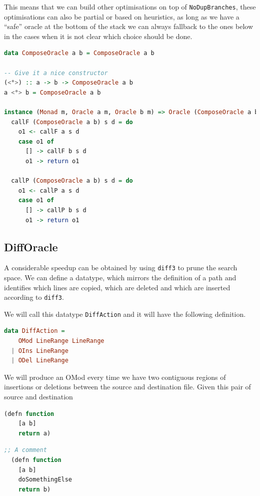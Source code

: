\documentclass[11pt]{article}
\begin{document}
This means that we can build other optimisations on top of 
\texttt{NoDupBranches}, these optimisations can also be partial or based on 
heuristics, as long as we have a ``safe'' oracle at the bottom of the stack we 
can always fallback to the ones below in the cases when it is not clear which 
choice should be done.


\begin{lstlisting}[language=haskell]
  data ComposeOracle a b = ComposeOracle a b

-- Give it a nice constructor
(<°>) :: a -> b -> ComposeOracle a b
a <°> b = ComposeOracle a b

instance (Monad m, Oracle a m, Oracle b m) => Oracle (ComposeOracle a b) m where
  callF (ComposeOracle a b) s d = do
    o1 <- callF a s d
    case o1 of
      [] -> callF b s d
      o1 -> return o1

  callP (ComposeOracle a b) s d = do
    o1 <- callP a s d
    case o1 of
      [] -> callP b s d
      o1 -> return o1
\end{lstlisting}

\subsection{DiffOracle}
A considerable speedup can be obtained by using \texttt{diff3} to prune the 
search space. We can define a datatype, which mirrors the definition of a path 
and identifies which lines are copied, which are deleted and which are inserted 
according to \texttt{diff3}.

We will call this datatype \texttt{DiffAction} and it will have the following 
definition.

\begin{lstlisting}[language=haskell]
  data DiffAction = 
    OMod LineRange LineRange
  | OIns LineRange
  | ODel LineRange  
\end{lstlisting}

We will produce an OMod every time we have two contiguous regions of insertions 
or deletions between the source and destination file.
Given this pair of source and destination
\begin{lstlisting}[language=lisp]
  (defn function
    [a b]
    return a)
\end{lstlisting}

\begin{lstlisting}[language=lisp]
  ;; A comment
  (defn function
    [a b]
    doSomethingElse
    return b)
\end{lstlisting}
\end{document}
